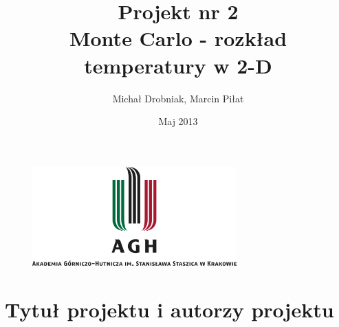 \documentclass[12pt,a4paper]{article}
\begin{document}
\title{\LARGE  Projekt nr 2 \\ \vspace{0.4cm} \textbf{Monte Carlo - rozkład temperatury w 2-D}}
\author{Michał Drobniak, 
 Marcin Piłat }
\date{Maj 2013}
\maketitle

\vfill
\begin{figure}[H]
\begin{center}
\includegraphics[width=0.7\textwidth]{agh_nzw_s_pl_1w_wbr_rgb_150ppi.jpg}
\end{center}
\end{figure}
\newpage

\section{Tytuł projektu i autorzy projektu}
\end{document}
